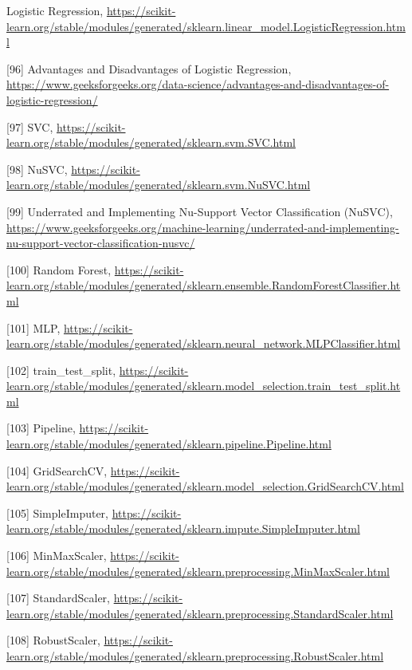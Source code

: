 \documentclass{article}
\begin{document}
\begin{raggedright}
[95] Logistic Regression, \url{https://scikit-learn.org/stable/modules/generated/sklearn.linear_model.LogisticRegression.html}

[96] Advantages and Disadvantages of Logistic Regression, \url{https://www.geeksforgeeks.org/data-science/advantages-and-disadvantages-of-logistic-regression/}

[97] SVC, \url{https://scikit-learn.org/stable/modules/generated/sklearn.svm.SVC.html}

[98] NuSVC, \url{https://scikit-learn.org/stable/modules/generated/sklearn.svm.NuSVC.html}

[99] Underrated and Implementing Nu-Support Vector Classification (NuSVC), \url{https://www.geeksforgeeks.org/machine-learning/underrated-and-implementing-nu-support-vector-classification-nusvc/}

[100] Random Forest, \url{https://scikit-learn.org/stable/modules/generated/sklearn.ensemble.RandomForestClassifier.html}

[101] MLP, \url{https://scikit-learn.org/stable/modules/generated/sklearn.neural_network.MLPClassifier.html}

[102] train\_test\_split, \url{https://scikit-learn.org/stable/modules/generated/sklearn.model_selection.train_test_split.html}

[103] Pipeline, \url{https://scikit-learn.org/stable/modules/generated/sklearn.pipeline.Pipeline.html}

[104] GridSearchCV, \url{https://scikit-learn.org/stable/modules/generated/sklearn.model_selection.GridSearchCV.html}

[105] SimpleImputer, \url{https://scikit-learn.org/stable/modules/generated/sklearn.impute.SimpleImputer.html}

[106] MinMaxScaler, \url{https://scikit-learn.org/stable/modules/generated/sklearn.preprocessing.MinMaxScaler.html}

[107] StandardScaler, \url{https://scikit-learn.org/stable/modules/generated/sklearn.preprocessing.StandardScaler.html}

[108] RobustScaler, \url{https://scikit-learn.org/stable/modules/generated/sklearn.preprocessing.RobustScaler.html}

\end{raggedright}
\end{document}
